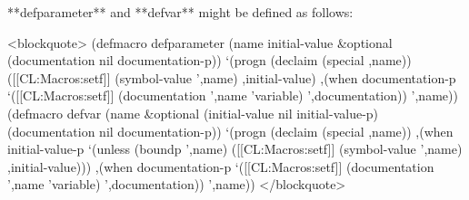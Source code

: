 **defparameter** and **defvar** might be defined as follows:

<blockquote>
(defmacro defparameter (name initial-value &optional (documentation nil documentation-p))
  `(progn 
     (declaim (special ,name)) 
     ([[CL:Macros:setf]] (symbol-value ',name) ,initial-value)
     ,(when documentation-p 
        `([[CL:Macros:setf]] (documentation ',name 'variable) ',documentation)) ',name))
(defmacro defvar (name &optional (initial-value nil initial-value-p) (documentation nil documentation-p))
   `(progn 
      (declaim (special ,name)) 
      ,(when initial-value-p 
         `(unless (boundp ',name) 
            ([[CL:Macros:setf]] (symbol-value ',name) ,initial-value))) 
      ,(when documentation-p 
         `([[CL:Macros:setf]] (documentation ',name 'variable) ',documentation)) ',name))
</blockquote>

    
